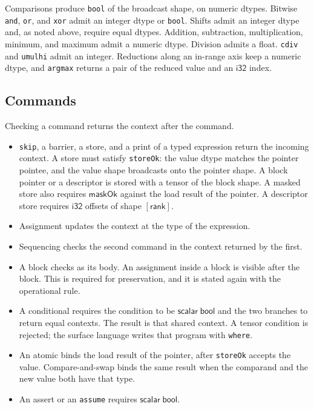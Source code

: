 \documentclass[a4paper,UKenglish,anonymous,cleveref,autoref]{lipics-v2021}
\begin{document}
Comparisons produce \texttt{bool} of the broadcast shape, on numeric dtypes.
Bitwise \texttt{and}, \texttt{or}, and \texttt{xor} admit an integer dtype or \texttt{bool}.
Shifts admit an integer dtype and, as noted above, require equal dtypes.
Addition, subtraction, multiplication, minimum, and maximum admit a numeric dtype.
Division admits a float.
\texttt{cdiv} and \texttt{umulhi} admit an integer.
Reductions along an in-range axis keep a numeric dtype, and \texttt{argmax} returns a pair of the reduced value and an \(\mathsf{i32}\) index.

\subsection{Commands}

Checking a command returns the context after the command.
\begin{itemize}
\item \texttt{skip}, a barrier, a store, and a print of a typed expression return the incoming context.
A store must satisfy \texttt{storeOk}: the value dtype matches the pointer pointee, and the value shape broadcasts onto the pointer shape.
A block pointer or a descriptor is stored with a tensor of the block shape.
A masked store also requires \(\mathsf{maskOk}\) against the load result of the pointer.
A descriptor store requires \(\mathsf{i32}\) offsets of shape \([\mathsf{rank}]\).
\item Assignment updates the context at the type of the expression.
\item Sequencing checks the second command in the context returned by the first.
\item A block checks as its body.
An assignment inside a block is visible after the block.
This is required for preservation, and it is stated again with the operational rule.
\item A conditional requires the condition to be \(\mathsf{scalar}\;\mathsf{bool}\) and the two branches to return equal contexts.
The result is that shared context.
A tensor condition is rejected; the surface language writes that program with \texttt{where}.
\item An atomic binds the load result of the pointer, after \texttt{storeOk} accepts the value.
Compare-and-swap binds the same result when the comparand and the new value both have that type.
\item An assert or an \texttt{assume} requires \(\mathsf{scalar}\;\mathsf{bool}\).
\end{itemize}
\end{document}
